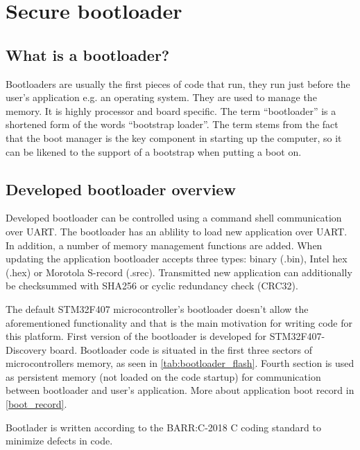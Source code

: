\chapter{Secure bootloader}
\label{custom_bootloader}

\section{What is a bootloader?}

Bootloaders are usually the first pieces of code that run, they run just before the user's application e.g. an operating system. They are used to manage the memory. It is highly processor and board specific. The term “bootloader” is a shortened form of the words “bootstrap loader”. The term stems from the fact that the boot manager is the key component in starting up the computer, so it can be likened to the support of a bootstrap when putting a boot on.\citep{bootloader_intro} 

\section{Developed bootloader overview}

Developed bootloader can be controlled using a command shell communication over UART. The bootloader has an ablility to load new application over UART. In addition, a number of memory management functions are added. When updating the application bootloader accepts three types: binary (.bin), Intel hex (.hex) or Morotola S-record (.srec). Transmitted new application can additionally be checksummed with SHA256 or cyclic redundancy check (CRC32).

The default STM32F407 microcontroller's bootloader doesn't allow the aforementioned functionality and that is the main motivation for writing code for this platform. \citep{stm32f407_ref_man} First version of the bootloader is developed for STM32F407-Discovery board. Bootloader code is situated in the first three sectors of microcontrollers memory, as seen in \autoref{tab:bootloader_flash}. Fourth section is used as persistent memory (not loaded on the code startup) for communication between bootloader and user's application. More about application boot record in \autoref{boot_record}. 

Bootlader is written according to the BARR:C-2018 C coding standard to minimize defects in code. \citep{barr_c}

